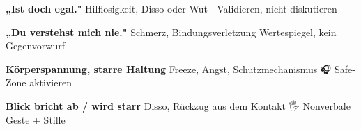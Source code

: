 {{{{\textbf{„Ist doch egal."}                                                                                                       Hilflosigkeit, Disso oder Wut                                                                                              💬 Validieren, nicht diskutieren

\textbf{„Du verstehst mich nie."}                                                                                               Schmerz, Bindungsverletzung                                                                                                \textcolor{ctmmPurple}{\faBrain} Wertespiegel, kein Gegenvorwurf

\textbf{Körperspannung, starre Haltung}                                                                                         Freeze, Angst, Schutzmechanismus                                                                                           🎧 Safe-Zone aktivieren

\textbf{Blick bricht ab / wird starr}                                                                                           Disso, Rückzug aus dem Kontakt                                                                                             🖐️ Nonverbale Geste + Stille

}}}}
